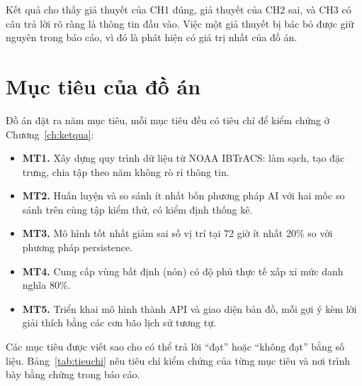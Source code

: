 Kết quả cho thấy giả thuyết của CH1 đúng, giả thuyết của CH2 sai, và CH3 có
câu trả lời rõ ràng là thông tin đầu vào. Việc một giả thuyết bị bác bỏ được
giữ nguyên trong báo cáo, vì đó là phát hiện có giá trị nhất của đồ án.

\section{Mục tiêu của đồ án}

Đồ án đặt ra năm mục tiêu, mỗi mục tiêu đều có tiêu chí để kiểm chứng ở
Chương~\ref{ch:ketqua}:
\begin{itemize}[leftmargin=1.6em, itemsep=2pt]
  \item \textbf{MT1.} Xây dựng quy trình dữ liệu từ NOAA IBTrACS: làm sạch,
        tạo đặc trưng, chia tập theo năm không rò rỉ thông tin.
  \item \textbf{MT2.} Huấn luyện và so sánh ít nhất bốn phương pháp AI với hai
        mốc so sánh trên cùng tập kiểm thử, có kiểm định thống kê.
  \item \textbf{MT3.} Mô hình tốt nhất giảm sai số vị trí tại 72 giờ ít nhất
        20\% so với phương pháp persistence.
  \item \textbf{MT4.} Cung cấp vùng bất định (nón) có độ phủ thực tế xấp xỉ
        mức danh nghĩa 80\%.
  \item \textbf{MT5.} Triển khai mô hình thành API và giao diện bản đồ, mỗi gợi
        ý kèm lời giải thích bằng các cơn bão lịch sử tương tự.
\end{itemize}

Các mục tiêu được viết sao cho có thể trả lời ``đạt'' hoặc ``không đạt'' bằng
số liệu. Bảng~\ref{tab:tieuchi} nêu tiêu chí kiểm chứng của từng mục tiêu và
nơi trình bày bằng chứng trong báo cáo.

